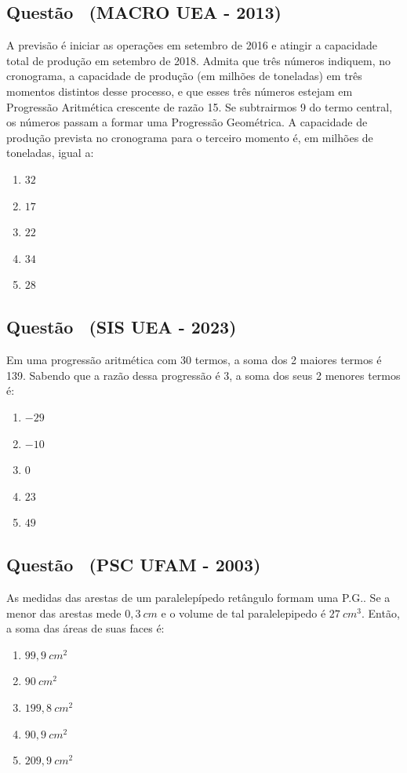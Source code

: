 \documentclass[12pt]{article}
\newcounter{questao}
\newcommand{\novaquestao}[1]{%
  \stepcounter{questao}%
  \subsection*{Questão \thequestao\ (#1)}%
}
\begin{document}
    \begin{multicols}{2}
        \columnseprule=0.4pt
        \columnsep=20pt
        
        \novaquestao{MACRO UEA - 2013}
            A previsão é iniciar as operações em setembro de 2016 e atingir a capacidade total de produção em setembro de 2018. Admita que três números indiquem, no cronograma, a capacidade de produção (em milhões de toneladas) em três momentos distintos desse processo, e que esses três números estejam em Progressão Aritmética crescente de razão 15. Se subtrairmos 9 do termo central, os números passam a formar uma Progressão Geométrica. A capacidade de produção prevista no cronograma para o terceiro momento é, em milhões de toneladas, igual a:
            
            \begin{enumerate}[label=(\alph*), noitemsep]
                \item $32$
                \item $17$
                \item $22$
                \item $34$
                \item $28$
            \end{enumerate}
        
        \novaquestao{SIS UEA - 2023}
            Em uma progressão aritmética com 30 termos, a soma dos 2 maiores termos é 139. Sabendo que a razão dessa progressão é 3, a soma dos seus 2 menores termos é:
        
            \begin{enumerate}[label=(\alph*), noitemsep]
                \item $-29$
                \item $-10$
                \item $0$
                \item $23$
                \item $49$
            \end{enumerate}
        
        \novaquestao{PSC UFAM - 2003}
            As medidas das arestas de um paralelepípedo retângulo formam uma P.G.. Se a menor das arestas mede $ 0,3 \ cm$ e o volume de tal paralelepipedo é $27\ cm^{3}$. Então, a soma das áreas de suas faces é:
            
            \begin{enumerate}[label=(\alph*), noitemsep]
                \item $99,9\ cm^{2}$
                \item $90\ cm^{2}$
                \item $199,8\ cm^{2}$
                \item $90,9\ cm^{2}$
                \item $209,9\ cm^{2}$
            \end{enumerate}
        

\end{multicols}
\end{document}
